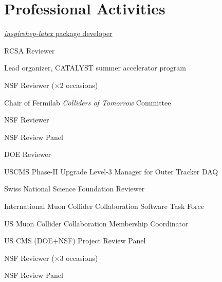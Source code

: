 \documentclass[11pt,letterpaper]{article}
\begin{document}
\section*{Professional Activities}


  \begin{itemizetighter}
    \item \href{https://github.com/lawrenceleejr/inspirehep-latex}{\emph{inspirehep-latex} package developer} 
    \item RCSA Reviewer  %
    \item Lead organizer, \textmu{}CATALYST summer accelerator program 
    \item NSF Reviewer ($\times$2 occasions) 
    \item Chair of Fermilab \emph{Colliders of Tomorrow} Committee 
    \item NSF Reviewer  %
    \item NSF Review Panel 
    \item DOE Reviewer 
    \item USCMS Phase-II Upgrade Level-3 Manager for Outer Tracker DAQ 

    \item Swiss National Science Foundation Reviewer 
    \item International Muon Collider Collaboration Software Task Force 
    \item US Muon Collider Collaboration Membership Coordinator 
    \item US CMS (DOE+NSF) Project Review Panel 
    \item NSF Reviewer ($\times$3 occasions) 
    \item NSF Review Panel 


\end{itemizetighter}
\end{document}
